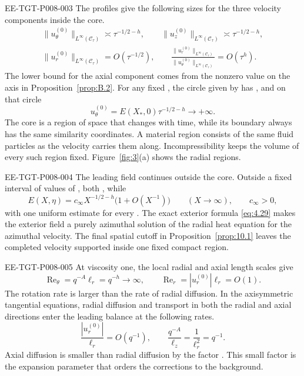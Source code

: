 \begin{EESegment}{EE-TGT-P008-003}
The profiles give the following sizes for the three velocity components inside the core.
\[
 \begin{gathered}
  \|u_\theta^{(0)}\|_{L^\infty(\mathcal C_\tau)}\asymp\tau^{-1/2-h},
  \qquad
  \|u_z^{(0)}\|_{L^\infty(\mathcal C_\tau)}\asymp\tau^{-1/2-h},\\
  \|u_r^{(0)}\|_{L^\infty(\mathcal C_\tau)}=O(\tau^{-1/2}),
  \qquad
  \frac{\|u_r^{(0)}\|_{L^\infty(\mathcal C_\tau)}}
       {\|u_\theta^{(0)}\|_{L^\infty(\mathcal C_\tau)}}=O(\tau^h).
 \end{gathered}
\]
The lower bound for the axial component comes from the nonzero value on the axis in
Proposition~\ref{prop:B.2}. For any fixed , the circle given by
 has
, and on that circle
\[
 u_\theta^{(0)}=E(X_*,0)\tau^{-1/2-h}\longrightarrow+\infty.
\]
The core is a region of space that changes with time, while its boundary always has the same
similarity coordinates. A material region consists of the same fluid particles as the velocity
carries them along. Incompressibility keeps the volume of every such region fixed. Figure~\ref{fig:3}(a)
shows the radial regions.
\end{EESegment}

\begin{EESegment}{EE-TGT-P008-004}
The leading field continues outside the core. Outside a fixed interval of values of
, both , while
\[
 E(X,\eta)=c_\infty X^{-1/2-h}\bigl(1+O(X^{-1})\bigr)
 \qquad (X\to\infty),\qquad c_\infty>0,
\]
with one uniform estimate for every . The exact exterior formula
\eqref{eq:4.29} makes the exterior field a purely azimuthal solution of the radial heat equation
for the azimuthal velocity. The final spatial cutoff in Proposition~\ref{prop:10.1} leaves the
completed velocity supported inside one fixed compact region.
\end{EESegment}

\begin{EESegment}{EE-TGT-P008-005}
At viscosity one, the local radial and axial length scales
 give
\[
 \operatorname{Re}_\theta=q^{-A}\ell_r=q^{-h}\longrightarrow\infty,
 \qquad
 \operatorname{Re}_r=|u_r^{(0)}|\ell_r=O(1).
\]
The rotation rate is larger than the rate of radial diffusion. In the axisymmetric tangential
equations, radial diffusion and transport in both the radial and axial directions enter the leading
balance at the following rates.
\[
 \frac{|u_r^{(0)}|}{\ell_r}=O(q^{-1}),
 \qquad
 \frac{q^{-A}}{\ell_z}=\frac1{\ell_r^2}=q^{-1}.
\]
Axial diffusion is smaller than radial diffusion by the factor
. This small factor is the expansion parameter that
orders the corrections to the background.
\end{EESegment}

